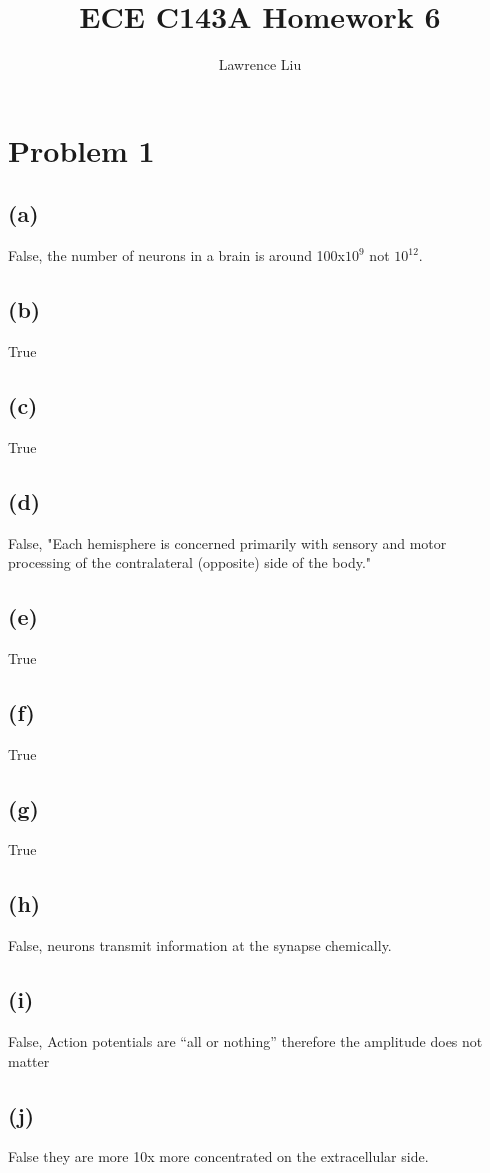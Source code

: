 \documentclass[12pt]{article}
\title{ECE C143A Homework 6}
\author{Lawrence Liu}
\begin{document}
\maketitle
\section*{Problem 1}
\subsection*{(a)}
False, the number of neurons in a brain is around 100x$10^9$ not $10^{12}$.
\subsection*{(b)}
True
\subsection*{(c)}
True
\subsection*{(d)}
False, "Each hemisphere is concerned primarily with sensory and motor processing of the contralateral (opposite) side of the body."
\subsection*{(e)}
True
\subsection*{(f)}
True
\subsection*{(g)}
True
\subsection*{(h)}
False,  neurons transmit information at the synapse chemically.

\subsection*{(i)}
False, Action potentials are “all or nothing” therefore the amplitude does not matter
\subsection*{(j)}
False they are more 10x more concentrated on the extracellular side.
\end{document}
